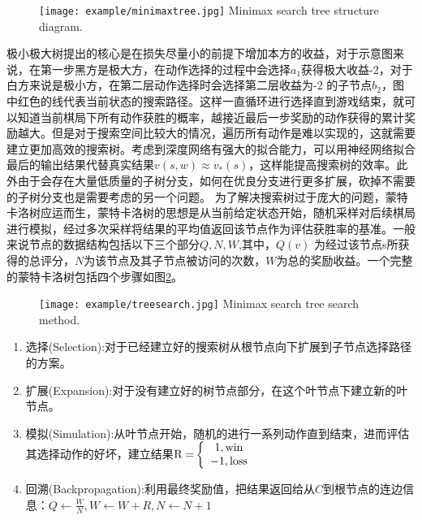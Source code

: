 \begin{figure}[htbp]
	\centering
	\texttt{[image: example/minimaxtree.jpg]}
	{Minimax search tree structure diagram.}
	\label{minimaxsearchtree}
\end{figure}
极小极大树提出的核心是在损失尽量小的前提下增加本方的收益，对于示意图来说，在第一步黑方是极大方，在动作选择的过程中会选择$a_1$获得极大收益-2，对于白方来说是极小方，在第二层动作选择时会选择第二层收益为-2 的子节点$b_2$，图中红色的线代表当前状态的搜索路径。这样一直循环进行选择直到游戏结束，就可以知道当前棋局下所有动作获胜的概率，越接近最后一步奖励的动作获得的累计奖励越大。但是对于搜索空间比较大的情况，遍历所有动作是难以实现的，这就需要建立更加高效的搜索树。考虑到深度网络有强大的拟合能力，可以用神经网络拟合最后的输出结果代替真实结果$v(s,w) \approx {v_*}(s)$，这样能提高搜索树的效率。此外由于会存在大量低质量的子树分支，如何在优良分支进行更多扩展，砍掉不需要的子树分支也是需要考虑的另一个问题。
为了解决搜索树过于庞大的问题，蒙特卡洛树应运而生，蒙特卡洛树的思想是从当前给定状态开始，随机采样对后续棋局进行模拟，经过多次采样将结果的平均值返回该节点作为评估获胜率的基准。一般来说节点的数据结构包括以下三个部分${Q,N,W}$,其中，$Q(v)$ 为经过该节点s所获得的总评分，$N$为该节点及其子节点被访问的次数，$W$为总的奖励收益。一个完整的蒙特卡洛树包括四个步骤如图\ref{fig:treesearch}。

\begin{figure}[htbp]
	\centering
	\texttt{[image: example/treesearch.jpg]}
	{Minimax search tree search method.}
	\label{fig:treesearch}
\end{figure}

\begin{enumerate}
	\item 选择(Selection):对于已经建立好的搜索树从根节点向下扩展到子节点选择路径的方案。
	\item 扩展(Expansion):对于没有建立好的树节点部分，在这个叶节点下建立新的叶节点。
	\item 模拟(Simulation):从叶节点开始，随机的进行一系列动作直到结束，进而评估其选择动作的好坏，建立结果${\rm{R = }}\left\{ {\begin{array}{*{20}{c}}
		{{\rm{1,win}}}\\
		{{\rm{ - 1,loss}}}
		\end{array}} \right.$
	\item 回溯(Backpropagation):利用最终奖励值，把结果返回给从$C$到根节点的连边信息：$Q \leftarrow \frac{W}{N},W \leftarrow W + R,N \leftarrow N + 1$
\end{enumerate}

